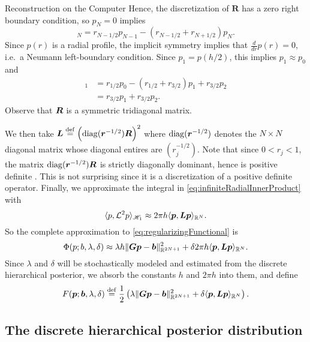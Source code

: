 \begin{chapter}{Reconstruction on the Computer}
Hence, the discretization of $\bm R$ has a zero right boundary condition, so $p_{N}= 0$ implies
\begin{equation}
  [\vect R\vect p]_N = r_{N-1/2}p_{N-1} - (r_{N-1/2}+r_{N+1/2})p_N.
\end{equation}
Since $p(r)$ is a radial profile, the implicit symmetry implies that $\frac d{dr}p(r) = 0$, i.e.~a Neumann left-boundary condition. 
Since $p_1 = p( h/2 )$, this implies $p_1 \approx p_{0}$ and
\begin{align}
  [\vect R\vect p]_1 &= r_{1/2}p_0 - (r_{1/2}+r_{3/2})p_1 + r_{3/2}p_{2} \nonumber\\
  &= r_{3/2}p_1 + r_{3/2}p_{2}.
\end{align}
Observe that $\mbox{\boldmath$R$}$ is a symmetric tridiagonal matrix.

We then take $\mbox{\boldmath$L$} \stackrel{\rm def}{=} \Big(\mathrm{diag}(\mbox{\boldmath$r$}^{-1/2}) \mbox{\boldmath$R$}\Big)^2$ where $\mathrm{diag}(\mbox{\boldmath$r$}^{-1/2})$ denotes the $N\times N$ diagonal matrix whose diagonal entires are $(r_j^{-1/2})$.
Note that since $0<r_j<1$, the matrix $\mathrm{diag}(\mbox{\boldmath$r$}^{-1/2}) \mbox{\boldmath$R$}$ is strictly diagonally dominant, hence is positive definite \citep[Theorem 3.4.3]{golub2012matrix}.
This is not surprising since it is a discretization of a positive definite operator.
Finally, we approximate the integral in \eqref{eq:infiniteRadialInnerProduct} with 
\begin{equation}\label{eq:psfDiscInvProblem}
  \langle p, \mathcal L^2 p\rangle_{\mathscr H_1} \approx 2\pi h \langle \mbox{\boldmath$p$}, \mbox{\boldmath$L$} \mbox{\boldmath$p$}\rangle_{\mathbb R^N}.
\end{equation}
So the complete approximation to \eqref{eq:regularizingFunctional} is
\begin{equation} \label{eq:discreteRegularizingFunctional}
  \Phi(p; b,\lambda,\delta) \approx \lambda h \|\mbox{\boldmath$G$}\mbox{\boldmath$p$} - \mbox{\boldmath$b$}\|_{\mathbb R^{2N+1}}^2 + \delta 2\pi h\langle \mbox{\boldmath$p$}, \mbox{\boldmath$L$} \mbox{\boldmath$p$}\rangle_{\mathbb R^N}.
\end{equation}
Since $\lambda$ and $\delta$ will be stochastically modeled and estimated from the discrete hierarchical posterior, we absorb the constants $h$ and $2\pi h$ into them, and define
\begin{equation} \label{discreteRegularizingFunctional}
  F(\mbox{\boldmath$p$}; \mbox{\boldmath$b$},\lambda,\delta) \stackrel{\rm def}{=} \frac 12\left(\lambda \|\mbox{\boldmath$G$}\mbox{\boldmath$p$} - \mbox{\boldmath$b$}\|_{\mathbb R^{2N+1}}^2 + \delta \langle \mbox{\boldmath$p$}, \mbox{\boldmath$L$} \mbox{\boldmath$p$}\rangle_{\mathbb R^N}\right).
\end{equation}
\subsection{The discrete hierarchical posterior distribution}


\end{chapter}
